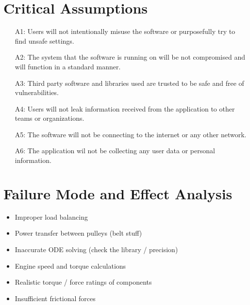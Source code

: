 \documentclass{article}
\begin{document}
\section{Critical Assumptions}


\begin{itemize}
    \item [A1:] Users will not intentionally misuse the software or purposefully try to find unsafe settings.
    \item [A2:] The system that the software is running on will be not compromised and will function in a standard manner.
    \item [A3:] Third party software and libraries used are trusted to be safe and free of vulnerabilities.
    \item [A4:] Users will not leak information received from the application to other teams or organizations. 
    \item [A5:] The software will not be connecting to the internet or any other network.
    \item [A6:] The application wil not be collecting any user data or personal information.
\end{itemize}


\section{Failure Mode and Effect Analysis}



\begin{itemize}
    \item Improper load balancing
    \item Power transfer between pulleys (belt stuff)
    \item Inaccurate ODE solving (check the library / precision)
    \item Engine speed and torque calculations 
    \item Realistic torque / force ratings of components
    \item Insufficient frictional forces
\end{itemize}
\end{document}

